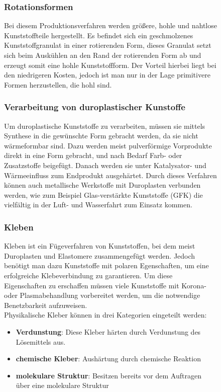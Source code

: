 \begin{figure}
\subsubsection{Rotationsformen}
Bei diesem Produktionsverfahren werden größere, hohle und nahtlose Kunststoffteile hergestellt. Es befindet sich
ein geschmolzenes Kunststoffgranulat in einer rotierenden Form, dieses Granulat setzt sich beim Auskühlen an den
Rand der rotierenden Form ab und erzeugt somit eine hohle Kunststoffform.
Der Vorteil hierbei liegt bei den niedrigeren Kosten, jedoch ist man nur in der Lage primitivere Formen herzustellen,
die hohl sind.

\subsubsection{Verarbeitung von duroplastischer Kunstoffe}
Um duroplastische Kunststoffe zu verarbeiten, müssen sie mittels Synthese in die gewünschte Form gebracht werden, da sie
nicht wärmeformbar sind. Dazu werden meist pulverförmige Vorprodukte direkt in eine Form gebracht, und nach Bedarf
Farb- oder Zusatzstoffe beigefügt. Danach werden sie unter Katalysator- und Wärmeeinfluss zum Endprodukt ausgehärtet.
Durch dieses Verfahren können auch metallische Werkstoffe mit Duroplasten verbunden werden, wie zum Beispiel
Glas-verstärkte Kunststoffe (GFK) die vielfältig in der Luft- und Wasserfahrt zum Einsatz kommen.

\subsubsection{Kleben}
Kleben ist ein Fügeverfahren von Kunststoffen, bei dem meist Duroplasten und Elastomere zusammengefügt werden.
Jedoch benötigt man dazu Kunststoffe mit polaren Egenschaften, um eine erfolgreiche Klebeverbindung zu garantieren.
Um diese Eigenschaften zu erschaffen müssen viele Kunststoffe mit Korona- oder Plasmabehandlung vorbereitet werden,
um die notwendige Benetzbarkeit aufzuweisen.\\
Physikalische Kleber können in drei Kategorien eingeteilt werden:
\begin{itemize}
    \item \textbf{Verdunstung}: Diese Kleber härten durch Verdunstung des Lösemittels aus.
    \item \textbf{chemische Kleber}: Aushärtung durch chemische Reaktion
    \item \textbf{molekulare Struktur}: Besitzen bereits vor dem Auftragen über eine molekulare Struktur
\end{itemize}


\end{figure}
